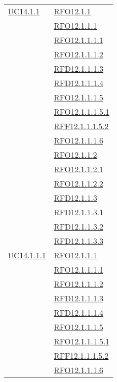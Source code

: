 \begin{longtable}{|>{\centering}m{5cm}|m{5cm}<{\centering}|}
\hyperlink{UC14.1.1}{UC14.1.1} 
& \hyperlink{RFO12.1.1}{RFO12.1.1}\\
& \hyperlink{RFO12.1.1.1}{RFO12.1.1.1}\\
& \hyperlink{RFO12.1.1.1.1}{RFO12.1.1.1.1}\\
& \hyperlink{RFO12.1.1.1.2}{RFO12.1.1.1.2}\\
& \hyperlink{RFD12.1.1.1.3}{RFD12.1.1.1.3}\\
& \hyperlink{RFD12.1.1.1.4}{RFD12.1.1.1.4}\\
& \hyperlink{RFO12.1.1.1.5}{RFO12.1.1.1.5}\\
& \hyperlink{RFO12.1.1.1.5.1}{RFO12.1.1.1.5.1}\\
& \hyperlink{RFF12.1.1.1.5.2}{RFF12.1.1.1.5.2}\\
& \hyperlink{RFO12.1.1.1.6}{RFO12.1.1.1.6}\\
& \hyperlink{RFO12.1.1.2}{RFO12.1.1.2}\\
& \hyperlink{RFO12.1.1.2.1}{RFO12.1.1.2.1}\\
& \hyperlink{RFO12.1.1.2.2}{RFO12.1.1.2.2}\\
& \hyperlink{RFD12.1.1.3}{RFD12.1.1.3}\\
& \hyperlink{RFD12.1.1.3.1}{RFD12.1.1.3.1}\\
& \hyperlink{RFD12.1.1.3.2}{RFD12.1.1.3.2}\\
& \hyperlink{RFD12.1.1.3.3}{RFD12.1.1.3.3}\\\hline

\hyperlink{UC14.1.1.1}{UC14.1.1.1} 
& \hyperlink{RFO12.1.1.1}{RFO12.1.1.1}\\
& \hyperlink{RFO12.1.1.1.1}{RFO12.1.1.1.1}\\
& \hyperlink{RFO12.1.1.1.2}{RFO12.1.1.1.2}\\
& \hyperlink{RFD12.1.1.1.3}{RFD12.1.1.1.3}\\
& \hyperlink{RFD12.1.1.1.4}{RFD12.1.1.1.4}\\
& \hyperlink{RFO12.1.1.1.5}{RFO12.1.1.1.5}\\
& \hyperlink{RFO12.1.1.1.5.1}{RFO12.1.1.1.5.1}\\
& \hyperlink{RFF12.1.1.1.5.2}{RFF12.1.1.1.5.2}\\
& \hyperlink{RFO12.1.1.1.6}{RFO12.1.1.1.6}\\\hline


\end{longtable}
